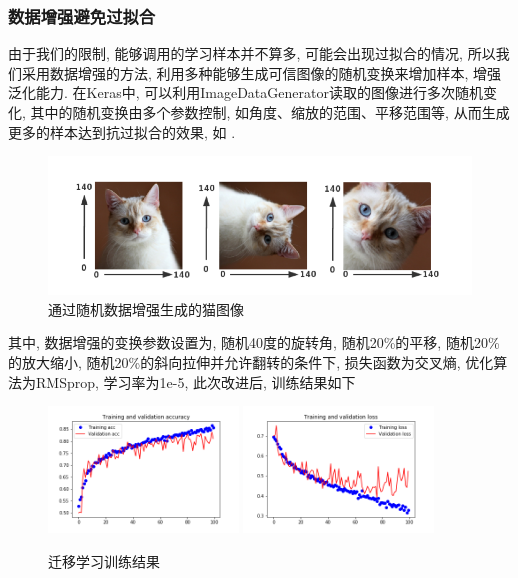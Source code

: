 \documentclass[lang=cn,11pt]{elegantpaper}
\begin{document}
\subsubsection{数据增强避免过拟合}
由于我们的限制, 能够调用的学习样本并不算多, 可能会出现过拟合的情况, 所以我们采用数据增强的方法, 利用多种能够生成可信图像的随机变换来增加样本, 增强泛化能力.  在Keras中, 可以利用ImageDataGenerator读取的图像进行多次随机变化, 其中的随机变换由多个参数控制, 如角度、缩放的范围、平移范围等, 从而生成更多的样本达到抗过拟合的效果, 如 .
\begin{figure}[htbp]
\centering
  \includegraphics{aug.png}
  \caption{通过随机数据增强生成的猫图像\label{fig:augcat}}
\end{figure}

其中, 数据增强的变换参数设置为, 随机40度的旋转角, 随机20\%的平移, 随机20\%的放大缩小, 随机20\%的斜向拉伸并允许翻转的条件下, 损失函数为交叉熵, 优化算法为RMSprop, 学习率为1e-5, 此次改进后, 训练结果如下
\begin{figure}[hbt]
\centering
  \includegraphics[width=0.45\textwidth]{small_aug_1.png}
  \includegraphics[width=0.45\textwidth]{small_aug_2.png}
  \caption{迁移学习训练结果}
\end{figure}
\end{document}
